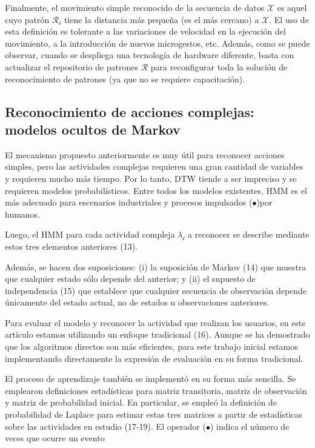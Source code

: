 \documentclass{article}
\begin{document}
Finalmente, el movimiento simple reconocido de la secuencia de datos $\mathscr{X}$ es aquel cuyo patrón $\mathscr{R_i}$ tiene la distancia más pequeña (es el más cercano) a $\mathscr{X}$. El uso de esta definición es tolerante a las variaciones de velocidad en la ejecución del movimiento, a la introducción de nuevos microgestos, etc. Además, como se puede observar, cuando se despliega una tecnología de hardware diferente, basta con actualizar el repositorio de patrones $\mathcal{R}$ para reconfigurar toda la solución de reconocimiento de patrones (ya que no se requiere capacitación).

\subsection{Reconocimiento de acciones complejas: modelos ocultos de Markov}
El mecanismo propuesto anteriormente es muy útil para reconocer acciones simples, pero las actividades complejas requieren una gran cantidad de variables y requieren mucho más tiempo. Por lo tanto, DTW tiende a ser impreciso y se requieren modelos probabilísticos. Entre todos los modelos existentes, HMM es el más adecuado para escenarios industriales y procesos impulsados ($\bullet$)por humanos.


Luego, el HMM para cada actividad compleja $\mathscr{\lambda_i}$ a reconocer se describe mediante estos tres elementos anteriores (13).

Además, se hacen dos suposiciones: (i) la suposición de Markov (14) que muestra que cualquier estado sólo depende del anterior; y (ii) el supuesto de independencia (15) que establece que cualquier secuencia de observación depende únicamente del estado actual, no de estados u observaciones anteriores.

Para evaluar el modelo y reconocer la actividad que realizan los usuarios, en este artículo estamos utilizando un enfoque tradicional (16). Aunque se ha demostrado que los algoritmos directos son más eficientes, para este trabajo inicial estamos implementando directamente la expresión de evaluación en su forma tradicional.

El proceso de aprendizaje también se implementó en su forma más sencilla. Se emplearon definiciones estadísticas para matriz transitoria, matriz de observación y matriz de probabilidad inicial. En particular, se empleó la definición de probabilidad de Laplace para estimar estas tres matrices a partir de estadísticas sobre las actividades en estudio (17-19). El operador ($\bullet$) indica el número de veces que ocurre un evento
\end{document}
